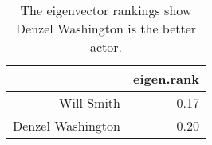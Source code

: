 \begin{table}[ht]
\centering
\begin{tabular}{rr}
  \toprule
 & eigen.rank \\ 
  \midrule
Will Smith & 0.17 \\ 
  Denzel Washington & 0.20 \\ 
   \bottomrule
\end{tabular}
\caption{The eigenvector rankings show Denzel Washington is the better actor.} 
\end{table}
